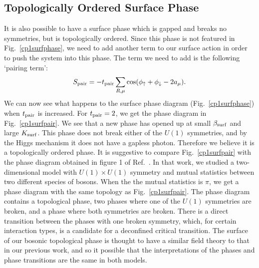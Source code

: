\documentclass[prb,twocolumn]{revtex4-1}
\begin{document}
\subsection{Topologically Ordered Surface Phase}
It is also possible to have a surface phase which is gapped and breaks no symmetries, but is topologically ordered.\cite{SenthilVishwanath} Since this phase is not featured in Fig.~\ref{cp1surfphase}, we need to add another term to our surface action in order to push the system into this phase. The term we need to add is the following `pairing term':\cite{Max}
\begin{equation}
S_{\rm pair}=-t_{\rm pair}\sum_{R,\mu} \cos(\phi_\uparrow+\phi_\downarrow-2a_\mu).
\label{pairing}
\end{equation} 
We can now see what happens to the surface phase diagram (Fig.~\ref{cp1surfphase}) when $t_{\rm pair}$ is increased. For $t_{\rm pair}=2$, we get the phase diagram in Fig.~\ref{cp1surfpair}. We see that a new phase has opened up at small $\beta_{\rm surf}$ and large $K_{\rm surf}$. This phase does not break either of the $U(1)$ symmetries, and by the Higgs mechanism it does not have a gapless photon. Therefore we believe it is a topologically ordered phase. It is suggestive to compare Fig.~\ref{cp1surfpair} with the phase diagram obtained in figure 1 of Ref.~. In that work, we studied a two-dimensional model with $U(1)\times U(1)$ symmetry and mutual statistics between two different species of bosons. When the the mutual statistics is $\pi$, we get a phase diagram with the same topology as Fig.~\ref{cp1surfpair}. The phase diagram contains a topological phase, two phases where one of the $U(1)$ symmetries are broken, and a phase where both symmetries are broken. There is a direct transition between the phases with one broken symmetry, which, for certain interaction types, is a candidate for a deconfined critical transition.\cite{Gen2Loops} The surface of our bosonic topological phase is thought to have a similar field theory to that in our previous work,\cite{Loopy,Gen2Loops} and so it possible that the interpretations of the phases and phase transitions are the same in both models.
\end{document}
